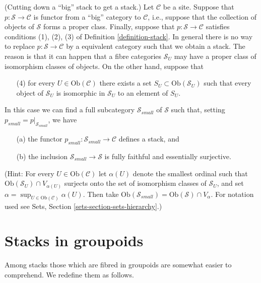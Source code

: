 \begin{remark}
\label{remark-stack-make-small}
(Cutting down a ``big'' stack to get a stack.)
Let $\mathcal{C}$ be a site. Suppose that $p : \mathcal{S} \to \mathcal{C}$
is functor from a ``big'' category to $\mathcal{C}$, i.e., suppose
that the collection of objects of $\mathcal{S}$ forms a proper class.
Finally, suppose that $p : \mathcal{S} \to \mathcal{C}$ satisfies
conditions (1), (2), (3) of
Definition \ref{definition-stack}.
In general there is no way to replace $p : \mathcal{S} \to \mathcal{C}$
by a equivalent category such that we obtain a stack. The reason is that
it can happen that a fibre categories $\mathcal{S}_U$ may have a proper
class of isomorphism classes of objects.
On the other hand, suppose that 
\begin{enumerate}
\item[(4)] for every $U \in \text{Ob}(\mathcal{C})$ there exists a set
$S_U \subset \text{Ob}(\mathcal{S}_U)$ such that every object of
$\mathcal{S}_U$ is isomorphic in $\mathcal{S}_U$ to an element of $S_U$.
\end{enumerate}
In this case we can find a full subcategory $\mathcal{S}_{small}$
of $\mathcal{S}$ such that, setting $p_{small} = p|_{\mathcal{S}_{small}}$,
we have
\begin{enumerate}
\item[(a)] the functor $p_{small} : \mathcal{S}_{small} \to \mathcal{C}$
defines a stack, and
\item[(b)] the inclusion $\mathcal{S}_{small} \to \mathcal{S}$
is fully faithful and essentially surjective.
\end{enumerate}
(Hint: For every $U \in \text{Ob}(\mathcal{C})$
let $\alpha(U)$ denote the smallest ordinal such that
$\text{Ob}(\mathcal{S}_U) \cap V_{\alpha(U)}$ surjects onto the set
of isomorphism classes of $\mathcal{S}_U$, and set
$\alpha = \sup_{U \in \text{Ob}(\mathcal{C})} \alpha(U)$.
Then take
$\text{Ob}(\mathcal{S}_{small}) = \text{Ob}(\mathcal{S}) \cap V_\alpha$.
For notation used see Sets, Section \ref{sets-section-sets-hierarchy}.)
\end{remark}







\section{Stacks in groupoids}
\label{section-stacks-in-groupoids}

\noindent
Among stacks those which are fibred in groupoids are somewhat easier
to comprehend. We redefine them as follows.

